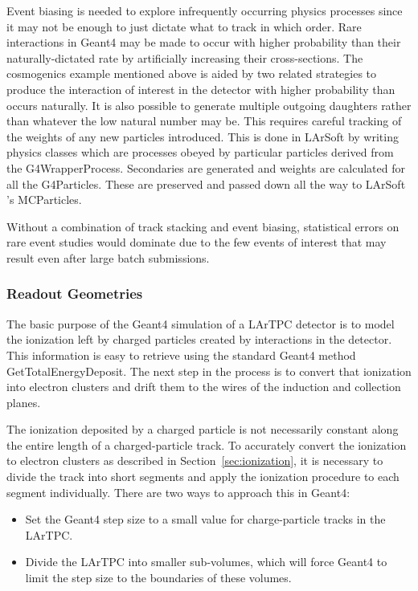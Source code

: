 \documentclass[12pt]{elsarticle}
\newcommand{\larsoft}{LArSoft }
\begin{document}
Event biasing is needed to explore infrequently occurring physics processes since it may
not be enough to just dictate what to track in which order. Rare interactions in Geant4 may be made to occur with higher 
probability than their naturally-dictated rate by artificially increasing their cross-sections. The cosmogenics example mentioned above is 
aided by two related strategies to produce the interaction of interest in the detector
with higher probability than occurs naturally. It is also possible to generate multiple outgoing daughters rather than whatever the low natural
number may be. This requires careful tracking of the weights of any new 
particles introduced. This is done in \larsoft by writing physics classes which are processes obeyed by particular particles derived from the G4WrapperProcess. Secondaries are generated 
and weights are calculated for all the G4Particles. These are preserved and passed down all the way to \larsoft's MCParticles.

Without a combination of track stacking and event biasing, statistical errors on rare event studies would dominate due to the few events of interest that may result even after large batch submissions.

\subsubsection{Readout Geometries}
\label{sec:detsim}

The basic purpose of the Geant4 simulation of a LArTPC detector is to
model the ionization left by charged particles created by interactions
in the detector. This information is easy to retrieve using the
standard Geant4 method GetTotalEnergyDeposit. The next
step in the process is to convert that ionization into electron
clusters and drift them to the wires of the induction and collection
planes. 

The ionization deposited by a charged particle is not necessarily
constant along the entire length of a charged-particle track. To
accurately convert the ionization to electron clusters as described in
Section~\ref{sec:ionization}, it is necessary to divide the track into
short segments and apply the ionization procedure to each segment
individually. There are two ways to approach this in Geant4:

\begin{itemize}
\item Set the Geant4 step size to a small value for charge-particle tracks in the LArTPC.
\item Divide the LArTPC into smaller sub-volumes, which will force Geant4 to limit the step size to the boundaries of these volumes.
\end{itemize}
\end{document}
